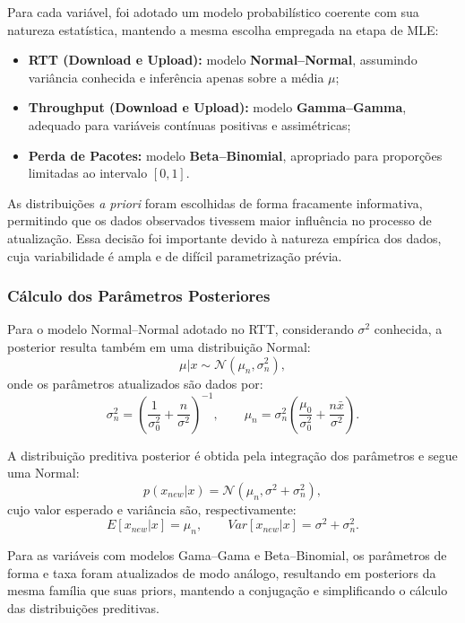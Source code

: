 \documentclass{article}
\begin{document}
Para cada variável, foi adotado um modelo probabilístico coerente com sua natureza estatística,
mantendo a mesma escolha empregada na etapa de MLE:
\begin{itemize}
	\item \textbf{RTT (Download e Upload):} modelo \textbf{Normal–Normal}, assumindo variância
	conhecida e inferência apenas sobre a média $\mu$;
	\item \textbf{Throughput (Download e Upload):} modelo \textbf{Gamma–Gamma}, adequado para
	variáveis contínuas positivas e assimétricas;
	\item \textbf{Perda de Pacotes:} modelo \textbf{Beta–Binomial}, apropriado para proporções
	limitadas ao intervalo $[0, 1]$.
\end{itemize}

As distribuições \textit{a priori} foram escolhidas de forma fracamente informativa,
permitindo que os dados observados tivessem maior influência no processo de atualização.
Essa decisão foi importante devido à natureza empírica dos dados, cuja variabilidade é ampla
e de difícil parametrização prévia.

\subsubsection{Cálculo dos Parâmetros Posteriores}

Para o modelo Normal–Normal adotado no RTT, considerando $\sigma^2$ conhecida, a posterior
resulta também em uma distribuição Normal:
\begin{equation}
	\mu | x \sim \mathcal{N}(\mu_n, \sigma_n^2),
\end{equation}
onde os parâmetros atualizados são dados por:
\begin{equation}
	\sigma_n^2 = \left( \frac{1}{\sigma_0^2} + \frac{n}{\sigma^2} \right)^{-1},
	\qquad
	\mu_n = \sigma_n^2 \left( \frac{\mu_0}{\sigma_0^2} + \frac{n \bar{x}}{\sigma^2} \right).
\end{equation}

A distribuição preditiva posterior é obtida pela integração dos parâmetros e segue
uma Normal:
\begin{equation}
	p(x_{new}|x) = \mathcal{N}(\mu_n, \sigma^2 + \sigma_n^2),
\end{equation}
cujo valor esperado e variância são, respectivamente:
\[
E[x_{new}|x] = \mu_n, \qquad
Var[x_{new}|x] = \sigma^2 + \sigma_n^2.
\]

Para as variáveis com modelos Gama–Gama e Beta–Binomial, os parâmetros de forma e taxa
foram atualizados de modo análogo, resultando em posteriors da mesma família que suas priors,
mantendo a conjugação e simplificando o cálculo das distribuições preditivas.
\end{document}
